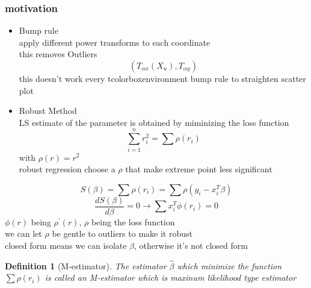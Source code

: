 \documentclass[10pt]{article}
\theoremstyle{break}
\newtheorem{defn}{Definition}[subsection]
\begin{document}
        \subsubsection{motivation}
            \begin{itemize}
                \item Bump rule
                \\apply different power transforms to each coordinate\\
                this removes Outliers
                $$\left(T_{\alpha x}(X_u), T_{\alpha y}\right)$$
                this doesn't work every tcolorboxenvironment
                bump rule to straighten scatter plot
                \item Robust Method \\
                LS estimate of the parameter is obtained by miminizing the loss function 
                $$\sum_{i=1}^nr_i^2=\sum\rho(r_i)$$ with $\rho(r)=r^2$
                \\robust regression choose a $\rho$ that make extreme point less significant
            \end{itemize}
            $$S(\beta)=\sum \rho(r_i)=\sum\rho(y_i-x_i^T\beta)$$
            $$\frac{dS(\beta)}{d\beta}=0 \rightarrow \sum x_i^T\phi (r_i)=0$$
            $\phi(r)$ being $\rho^{'}(r)$, $\rho$ being the loss function
            \\we can let $\rho$ be gentle to outliers to make it robust
            \\closed form means we can isolate $\beta$, otherwise it's not closed form
            \begin{defn}[M-estimator]
                The estimator $\hat{\beta}$ which minimize the function $\sum \rho(r_i)$
                is called an M-estimator which is maxinum likelihood type estimator
            \end{defn}
\end{document}
